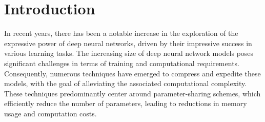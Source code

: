 \documentclass[nohyperref]{article}
\theoremstyle{plain}
\theoremstyle{definition}
\theoremstyle{remark}
\begin{document}
\section{Introduction}
\label{sec:intro}

In recent years, 
there has been a notable increase in the exploration of the expressive power of deep neural networks,
driven by their %
impressive
success in various learning tasks. 
The increasing size of deep neural network models poses significant challenges in terms of training and computational requirements. 
Consequently,
numerous techniques have emerged to compress and expedite these models, 
with the goal of alleviating the associated computational complexity.
These techniques predominantly center around parameter-sharing schemes, which efficiently reduce the number of parameters, leading to reductions in memory usage and computation costs.

\end{document}

